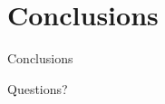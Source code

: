 \section{Conclusions}

\begin{frame}{Conclusions}

\pause

\begin{center}
  \Huge{Questions?}
\end{center}

%
%
%

\end{frame}
